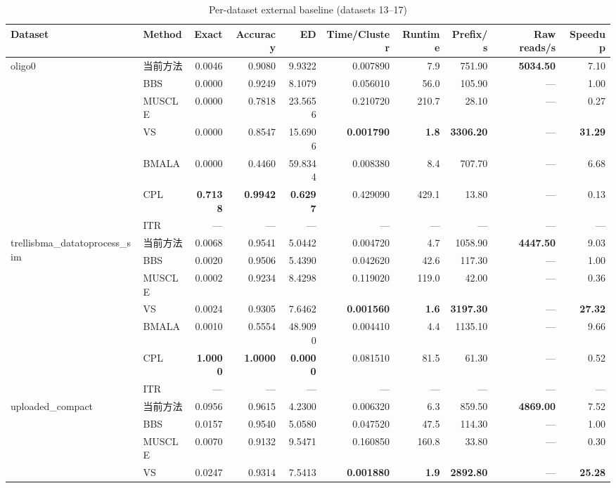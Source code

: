 \begin{table}[htbp]
\centering
\caption{Per-dataset external baseline (datasets 13–17)}
\label{tab:baselineC}
\small
\begin{tabular}{llrrrrrrrr}
\toprule
Dataset & Method & Exact & Accuracy & ED & Time/Cluster & Runtime & Prefix/s & Raw reads/s & Speedup \\
\midrule
\multirow{7}{*}{oligo0} & 当前方法 & 0.0046 & 0.9080 & 9.9322 & 0.007890 & 7.9 & 751.90 & \textbf{5034.50} & 7.10 \\
 & BBS & 0.0000 & 0.9249 & 8.1079 & 0.056010 & 56.0 & 105.90 & — & 1.00 \\
 & MUSCLE & 0.0000 & 0.7818 & 23.5656 & 0.210720 & 210.7 & 28.10 & — & 0.27 \\
 & VS & 0.0000 & 0.8547 & 15.6906 & \textbf{0.001790} & \textbf{1.8} & \textbf{3306.20} & — & \textbf{31.29} \\
 & BMALA & 0.0000 & 0.4460 & 59.8344 & 0.008380 & 8.4 & 707.70 & — & 6.68 \\
 & CPL & \textbf{0.7138} & \textbf{0.9942} & \textbf{0.6297} & 0.429090 & 429.1 & 13.80 & — & 0.13 \\
 & ITR & — & — & — & — & — & — & — & — \\
\midrule
\multirow{7}{*}{trellisbma\_datatoprocess\_sim} & 当前方法 & 0.0068 & 0.9541 & 5.0442 & 0.004720 & 4.7 & 1058.90 & \textbf{4447.50} & 9.03 \\
 & BBS & 0.0020 & 0.9506 & 5.4390 & 0.042620 & 42.6 & 117.30 & — & 1.00 \\
 & MUSCLE & 0.0002 & 0.9234 & 8.4298 & 0.119020 & 119.0 & 42.00 & — & 0.36 \\
 & VS & 0.0024 & 0.9305 & 7.6462 & \textbf{0.001560} & \textbf{1.6} & \textbf{3197.30} & — & \textbf{27.32} \\
 & BMALA & 0.0010 & 0.5554 & 48.9090 & 0.004410 & 4.4 & 1135.10 & — & 9.66 \\
 & CPL & \textbf{1.0000} & \textbf{1.0000} & \textbf{0.0000} & 0.081510 & 81.5 & 61.30 & — & 0.52 \\
 & ITR & — & — & — & — & — & — & — & — \\
\midrule
\multirow{7}{*}{uploaded\_compact} & 当前方法 & 0.0956 & 0.9615 & 4.2300 & 0.006320 & 6.3 & 859.50 & \textbf{4869.00} & 7.52 \\
 & BBS & 0.0157 & 0.9540 & 5.0580 & 0.047520 & 47.5 & 114.30 & — & 1.00 \\
 & MUSCLE & 0.0070 & 0.9132 & 9.5471 & 0.160850 & 160.8 & 33.80 & — & 0.30 \\
 & VS & 0.0247 & 0.9314 & 7.5413 & \textbf{0.001880} & \textbf{1.9} & \textbf{2892.80} & — & \textbf{25.28} \\

\end{tabular}
\end{table}
